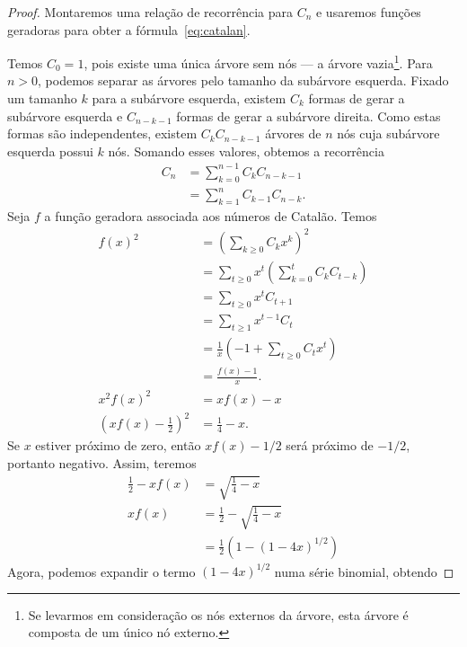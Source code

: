 \begin{proof}
    Montaremos uma relação de recorrência para $C_n$
    e usaremos funções geradoras para obter a fórmula~\ref{eq:catalan}.

    Temos $C_0 = 1$, pois existe uma única árvore sem nós --- a árvore vazia\footnote{
        Se levarmos em consideração os nós externos da árvore,
        esta árvore é composta de um único nó externo.
    }.
    Para $n > 0$,
    podemos separar as árvores pelo tamanho da subárvore esquerda.
    Fixado um tamanho $k$ para a subárvore esquerda,
    existem $C_{k}$ formas de gerar a subárvore esquerda
    e $C_{n-k-1}$ formas de gerar a subárvore direita.
    Como estas formas são independentes,
    existem $C_{k} C_{n-k-1}$ árvores de $n$ nós
    cuja subárvore esquerda possui $k$ nós.
    Somando esses valores, obtemos a recorrência
    \begin{align*}
        C_n &= \sum_{k = 0}^{n-1} C_k C_{n-k-1} \\
            &= \sum_{k = 1}^n C_{k-1} C_{n-k}.
    \end{align*}
    Seja $f$ a função geradora associada aos números de Catalão.
    Temos
    \begin{align*}
        f(x)^2 &= \left(\sum_{k \geq 0} C_k x^k\right)^2 \\
               &= \sum_{t \geq 0} x^t \left( \sum_{k = 0}^t C_k C_{t-k} \right) \\
               &= \sum_{t \geq 0} x^t C_{t+1} \\
               &= \sum_{t \geq 1} x^{t-1} C_t \\
               &= \frac 1 x \left( -1 + \sum_{t \geq 0} C_t x^t \right) \\
               &= \frac{f(x) - 1}{x}. \\
        x^2 f(x)^2 &= xf(x) - x \\
        \left(xf(x) - \frac 1 2\right)^2 &= \frac 1 4 - x.
    \end{align*}
    Se $x$ estiver próximo de zero,
    então $xf(x) - 1/2$ será próximo de $-1/2$,
    portanto negativo.
    Assim, teremos
    \begin{align*}
        \frac 1 2 - xf(x) &= \sqrt{\frac 1 4 - x} \\
        xf(x) &= \frac 1 2 - \sqrt{\frac 1 4 - x} \\
              &= \frac 1 2 (1 - (1 - 4x)^{1/2})
    \end{align*}
    Agora, podemos expandir o termo $(1 - 4x)^{1/2}$ numa série binomial,
    obtendo

\end{proof}
